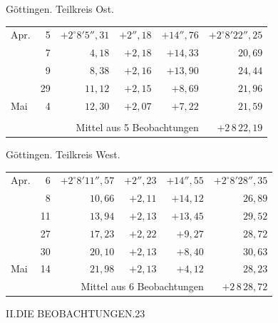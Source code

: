 \noindent\begin{minipage}[t]{.495\textwidth}\centering Göttingen. Teilkreis Ost.\par\smallskip
{\scriptsize\setlength{\tabcolsep}{1pt}\renewcommand{\arraystretch}{1.2}\begin{tabular}{lr|r|r|r|r|}
Apr.&5&$+2^\circ8'5''{,}31$&$+2''{,}18$&$+14''{,}76$&$+2^\circ8'22''{,}25$\\
&7&$4{,}18$&$+2{,}18$&$+14{,}33$&$20{,}69$\\
&9&$8{,}38$&$+2{,}16$&$+13{,}90$&$24{,}44$\\
&29&$11{,}12$&$+2{,}15$&$+8{,}69$&$21{,}96$\\
Mai&4&$12{,}30$&$+2{,}07$&$+7{,}22$&$21{,}59$\\
&&&&&\\
\cline{6-6}\multicolumn{5}{r}{Mittel aus 5 Beobachtungen}&$+2\,8\,22{,}19$
\end{tabular}}\end{minipage}\hfill\begin{minipage}[t]{.495\textwidth}\centering Göttingen. Teilkreis West.\par\smallskip
{\scriptsize\setlength{\tabcolsep}{1pt}\renewcommand{\arraystretch}{1.2}\begin{tabular}{lr|r|r|r|r}
Apr.&6&$+2^\circ8'11''{,}57$&$+2''{,}23$&$+14''{,}55$&$+2^\circ8'28''{,}35$\\
&8&$10{,}66$&$+2{,}11$&$+14{,}12$&$26{,}89$\\
&11&$13{,}94$&$+2{,}13$&$+13{,}45$&$29{,}52$\\
&27&$17{,}23$&$+2{,}22$&$+9{,}27$&$28{,}72$\\
&30&$20{,}10$&$+2{,}13$&$+8{,}40$&$30{,}63$\\
Mai&14&$21{,}98$&$+2{,}13$&$+4{,}12$&$28{,}23$\\
\cline{6-6}\multicolumn{5}{r}{Mittel aus 6 Beobachtungen}&$+2\,8\,28{,}72$
\end{tabular}}\end{minipage}
\par\vspace{4mm}

\clearpage
\noindent\mbox{}\hfill II.\quad DIE BEOBACHTUNGEN.\hfill 23\par

